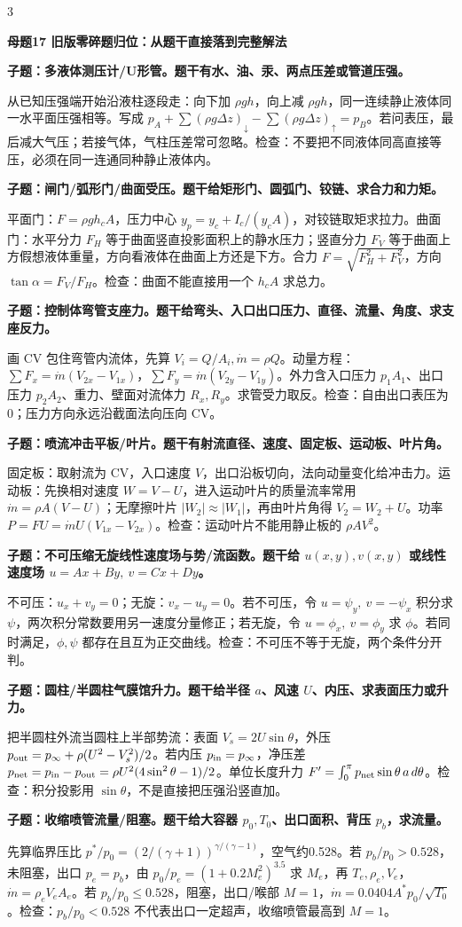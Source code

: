 \documentclass[a4paper]{article}
\newcommand{\mt}[1]{\vspace{0.45pt}\colorbox{M}{\parbox{\dimexpr\linewidth-2\fboxsep}{\color{white}\bfseries #1}}\par}
\newcommand{\qt}[1]{\vspace{0.25pt}\colorbox{Q}{\parbox{\dimexpr\linewidth-2\fboxsep}{\color{white}\bfseries #1}}\par}
\newcommand{\ans}[1]{\colorbox{G}{\parbox{\dimexpr\linewidth-2\fboxsep}{#1}}\par}
\begin{document}
\begin{multicols}{3}
\mt{母题17 旧版零碎题归位：从题干直接落到完整解法}
\qt{子题：多液体测压计/U形管。题干有水、油、汞、两点压差或管道压强。}
\ans{从已知压强端开始沿液柱逐段走：向下加 $\rho gh$，向上减 $\rho gh$，同一连续静止液体同一水平面压强相等。写成 $p_A+\sum(\rho g\Delta z)_{\downarrow}-\sum(\rho g\Delta z)_{\uparrow}=p_B$。若问表压，最后减大气压；若接气体，气柱压差常可忽略。检查：不要把不同液体同高直接等压，必须在同一连通同种静止液体内。}
\qt{子题：闸门/弧形门/曲面受压。题干给矩形门、圆弧门、铰链、求合力和力矩。}
\ans{平面门：$F=\rho gh_cA$，压力中心 $y_p=y_c+I_c/(y_cA)$，对铰链取矩求拉力。曲面门：水平分力 $F_H$ 等于曲面竖直投影面积上的静水压力；竖直分力 $F_V$ 等于曲面上方假想液体重量，方向看液体在曲面上方还是下方。合力 $F=\sqrt{F_H^2+F_V^2}$，方向 $\tan\alpha=F_V/F_H$。检查：曲面不能直接用一个 $h_cA$ 求总力。}
\qt{子题：控制体弯管支座力。题干给弯头、入口出口压力、直径、流量、角度、求支座反力。}
\ans{画 CV 包住弯管内流体，先算 $V_i=Q/A_i,\dot m=\rho Q$。动量方程：$\sum F_x=\dot m(V_{2x}-V_{1x})$，$\sum F_y=\dot m(V_{2y}-V_{1y})$。外力含入口压力 $p_1A_1$、出口压力 $p_2A_2$、重力、壁面对流体力 $R_x,R_y$。求管受力取反。检查：自由出口表压为0；压力方向永远沿截面法向压向 CV。}
\qt{子题：喷流冲击平板/叶片。题干有射流直径、速度、固定板、运动板、叶片角。}
\ans{固定板：取射流为 CV，入口速度 $V$，出口沿板切向，法向动量变化给冲击力。运动板：先换相对速度 $W=V-U$，进入运动叶片的质量流率常用 $\dot m=\rho A(V-U)$；无摩擦叶片 $|W_2|\approx |W_1|$，再由叶片角得 $V_2=W_2+U$。功率 $P=FU=\dot mU(V_{1x}-V_{2x})$。检查：运动叶片不能用静止板的 $\rho AV^2$。}
\qt{子题：不可压缩无旋线性速度场与势/流函数。题干给 $u(x,y),v(x,y)$ 或线性速度场 $u=Ax+By,\ v=Cx+Dy$。}
\ans{不可压：$u_x+v_y=0$；无旋：$v_x-u_y=0$。若不可压，令 $u=\psi_y,\ v=-\psi_x$ 积分求 $\psi$，两次积分常数要用另一速度分量修正；若无旋，令 $u=\phi_x,\ v=\phi_y$ 求 $\phi$。若同时满足，$\phi,\psi$ 都存在且互为正交曲线。检查：不可压不等于无旋，两个条件分开判。}
\qt{子题：圆柱/半圆柱气膜馆升力。题干给半径 $a$、风速 $U$、内压、求表面压力或升力。}
\ans{把半圆柱外流当圆柱上半部势流：表面 $V_s=2U\sin\theta$，外压 $p_{\rm out}=p_\infty+\rho(U^2-V_s^2)/2$。若内压 $p_{\rm in}=p_\infty$，净压差 $p_{\rm net}=p_{\rm in}-p_{\rm out}=\rho U^2(4\sin^2\theta-1)/2$。单位长度升力 $F'=\int_0^\pi p_{\rm net}\sin\theta\,a\,d\theta$。检查：积分投影用 $\sin\theta$，不是直接把压强沿竖直加。}
\qt{子题：收缩喷管流量/阻塞。题干给大容器 $p_0,T_0$、出口面积、背压 $p_b$，求流量。}
\ans{先算临界压比 $p^*/p_0=(2/(\gamma+1))^{\gamma/(\gamma-1)}$，空气约0.528。若 $p_b/p_0>0.528$，未阻塞，出口 $p_e=p_b$，由 $p_0/p_e=(1+0.2M_e^2)^{3.5}$ 求 $M_e$，再 $T_e,\rho_e,V_e$，$\dot m=\rho_eV_eA_e$。若 $p_b/p_0\le0.528$，阻塞，出口/喉部 $M=1$，$\dot m=0.0404A^*p_0/\sqrt{T_0}$。检查：$p_b/p_0<0.528$ 不代表出口一定超声，收缩喷管最高到 $M=1$。}

\end{multicols}
\end{document}
